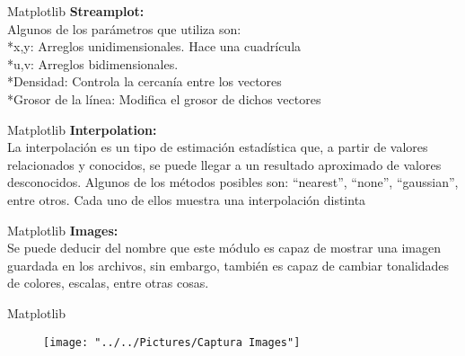 \documentclass{beamer}
\begin{document}
\begin{frame}{Matplotlib}
	\textbf{Streamplot:}\\ Algunos de los parámetros que utiliza son:\\
	*x,y: Arreglos unidimensionales. Hace una cuadrícula\\
	*u,v: Arreglos bidimensionales. \\
	*Densidad: Controla la cercanía entre los vectores\\
	*Grosor de la línea: Modifica el grosor de dichos vectores\\
\end{frame}

\begin{frame}{Matplotlib}
	\textbf{Interpolation:}\\ La interpolación es un tipo de estimación estadística que, a partir de valores relacionados y conocidos, se puede llegar a un resultado aproximado de valores desconocidos. Algunos de los métodos posibles son: “nearest”, “none”, “gaussian”, entre otros. Cada uno de ellos muestra una interpolación distinta
\end{frame}

\begin{frame}{Matplotlib}
	\textbf{Images:}\\ Se puede deducir del nombre que este módulo es capaz de mostrar una imagen guardada en los archivos, sin embargo, también es capaz de cambiar tonalidades de colores, escalas, entre otras cosas.
\end{frame}

\begin{frame}{Matplotlib}
	\begin{figure}
	\centering
	\texttt{[image: "../../Pictures/Captura Images"]}
	\caption{}
	\label{fig:captura-images}
\end{figure}

\end{frame}
\end{document}
